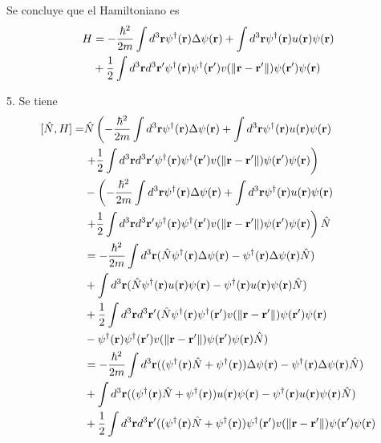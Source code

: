 \documentclass{article}
\begin{document}
Se concluye que el Hamiltoniano es
\begin{align}
\begin{split}
H&=-\frac{\hbar^2}{2m}\int d^3\vb{r} \psi^\dagger(\vb{r})\Delta\psi(\vb{r})+\int d^3\vb{r}\psi^\dagger(\vb{r})u(\vb{r})\psi(\vb{r})\\
&+\frac{1}{2}\int d^3\vb{r}d^3\vb{r}'\psi^\dagger(\vb{r})\psi^\dagger(\vb{r}')v(\|\vb{r}-\vb{r}'\|)\psi(\vb{r}')\psi(\vb{r})
\end{split}
\end{align}

5. Se tiene
\begin{align}
\begin{split}
[\hat{N},H]=&\hat{N}\left(-\frac{\hbar^2}{2m}\int d^3\vb{r} \psi^\dagger(\vb{r})\Delta\psi(\vb{r})+\int d^3\vb{r}\psi^\dagger(\vb{r})u(\vb{r})\psi(\vb{r})\right.\\
&\left.+\frac{1}{2}\int d^3\vb{r}d^3\vb{r}'\psi^\dagger(\vb{r})\psi^\dagger(\vb{r}')v(\|\vb{r}-\vb{r}'\|)\psi(\vb{r}')\psi(\vb{r})\right)\\
&-\left(-\frac{\hbar^2}{2m}\int d^3\vb{r} \psi^\dagger(\vb{r})\Delta\psi(\vb{r})+\int d^3\vb{r}\psi^\dagger(\vb{r})u(\vb{r})\psi(\vb{r})\right.\\
&\left.+\frac{1}{2}\int d^3\vb{r}d^3\vb{r}'\psi^\dagger(\vb{r})\psi^\dagger(\vb{r}')v(\|\vb{r}-\vb{r}'\|)\psi(\vb{r}')\psi(\vb{r})\right)\hat{N}\\
&=-\frac{\hbar^2}{2m}\int d^3\vb{r}(\hat{N}\psi^\dagger(\vb{r})\Delta\psi(\vb{r})-\psi^\dagger(\vb{r})\Delta\psi(\vb{r})\hat{N})\\
&+\int d^3\vb{r}(\hat{N}\psi^\dagger(\vb{r})u(\vb{r})\psi(\vb{r})-\psi^\dagger(\vb{r})u(\vb{r})\psi(\vb{r})\hat{N})\\
&+\frac{1}{2}\int d^3\vb{r}d^3\vb{r}'(\hat{N}\psi^\dagger(\vb{r})\psi^\dagger(\vb{r}')v(\|\vb{r}-\vb{r}'\|)\psi(\vb{r}')\psi(\vb{r})\\
&-\psi^\dagger(\vb{r})\psi^\dagger(\vb{r}')v(\|\vb{r}-\vb{r}'\|)\psi(\vb{r}')\psi(\vb{r})\hat{N})\\
&=-\frac{\hbar^2}{2m}\int d^3\vb{r}((\psi^\dagger(\vb{r})\hat{N}+\psi^\dagger(\vb{r}))\Delta\psi(\vb{r})-\psi^\dagger(\vb{r})\Delta\psi(\vb{r})\hat{N})\\
&+\int d^3\vb{r}((\psi^\dagger(\vb{r})\hat{N}+\psi^\dagger(\vb{r}))u(\vb{r})\psi(\vb{r})-\psi^\dagger(\vb{r})u(\vb{r})\psi(\vb{r})\hat{N})\\
&+\frac{1}{2}\int d^3\vb{r}d^3\vb{r}'((\psi^\dagger(\vb{r})\hat{N}+\psi^\dagger(\vb{r}))\psi^\dagger(\vb{r}')v(\|\vb{r}-\vb{r}'\|)\psi(\vb{r}')\psi(\vb{r})\\

\end{split}
\end{align}
\end{document}
